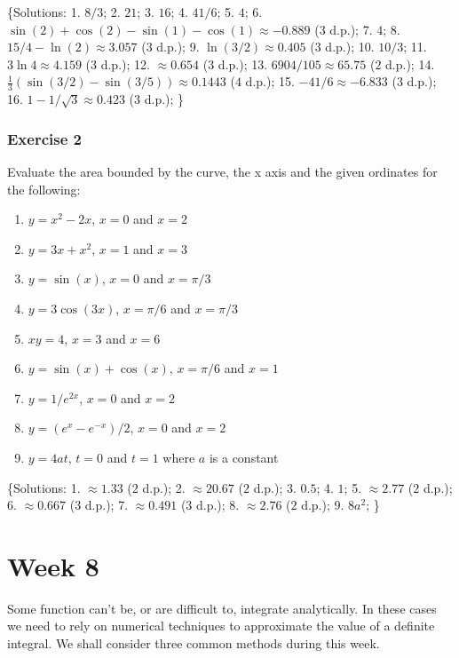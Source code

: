 \documentclass[
  11pt,
  oneside]{book}
\providecommand{\tightlist}{%
  \setlength{\itemsep}{0pt}\setlength{\parskip}{0pt}}
\newcommand{\slide}{}
\theoremstyle{definition}
\theoremstyle{definition}
\theoremstyle{definition}
\theoremstyle{definition}
\theoremstyle{remark}
\begin{document}
\{Solutions:
1. \(8/3\);
2. \(21\);
3. \(16\);
4. \(41/6\);
5. \(4\);
6. \(\sin(2)+\cos(2)-\sin(1)-\cos(1) \approx -0.889\) (\(3\) d.p.);
7. \(4\);
8. \(15/4 - \ln(2) \approx 3.057\) (\(3\) d.p.);
9. \(\ln(3/2) \approx 0.405\) (\(3\) d.p.);
10. \(10/3\);
11. \(3\ln4 \approx 4.159\) (\(3\) d.p.);
12. \(\approx 0.654\) (\(3\) d.p.);
13. \(6904/105 \approx 65.75\) (\(2\) d.p.);
14. \(\frac{1}{3}(\sin(3/2)-\sin(3/5)) \approx 0.1443\) (\(4\) d.p.);
15. \(-41/6 \approx -6.833\) (\(3\) d.p.);
16. \(1-1/\sqrt{3} \approx 0.423\) (\(3\) d.p.);
\}

\slide

\subsection*{Exercise 2}\label{exercise-2-6}

Evaluate the area bounded by the curve, the x axis and the given ordinates for the following:

\begin{enumerate}
\def\labelenumi{\arabic{enumi}.}
\tightlist
\item
  \(y=x^2-2x\), \(x=0\) and \(x=2\)
\item
  \(y=3x+x^2\), \(x=1\) and \(x=3\)
\item
  \(y=\sin(x)\), \(x=0\) and \(x=\pi/3\)
\item
  \(y=3\cos(3x)\), \(x=\pi/6\) and \(x=\pi/3\)
\item
  \(xy=4\), \(x=3\) and \(x=6\)
\item
  \(y=\sin(x)+\cos(x)\), \(x=\pi/6\) and \(x=1\)
\item
  \(y=1/e^{2x}\), \(x=0\) and \(x=2\)
\item
  \(y=(e^x-e^{-x})/2\), \(x=0\) and \(x=2\)
\item
  \(y=4at\), \(t=0\) and \(t=1\) where \(a\) is a constant
\end{enumerate}

\{Solutions:
1. \(\approx 1.33\) (\(2\) d.p.);
2. \(\approx 20.67\) (\(2\) d.p.);
3. \(0.5\);
4. \(1\);
5. \(\approx 2.77\) (\(2\) d.p.);
6. \(\approx 0.667\) (\(3\) d.p.);
7. \(\approx 0.491\) (\(3\) d.p.);
8. \(\approx 2.76\) (\(2\) d.p.);
9. \(8a^2\);
\}

\chapter{Week 8}\label{week-eight}

Some function can't be, or are difficult to, integrate analytically. In these cases we need to rely on numerical techniques to approximate the value of a definite integral. We shall consider three common methods during this week.
\end{document}
